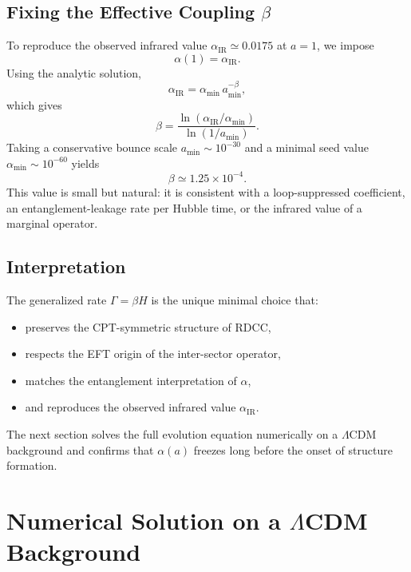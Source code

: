\documentclass[11pt,a4paper]{article}
\begin{document}
\subsection{Fixing the Effective Coupling \texorpdfstring{$\beta$}{beta}}

To reproduce the observed infrared value $\alpha_{\mathrm{IR}} \simeq 0.0175$ at $a = 1$, we impose
\begin{equation}
    \alpha(1) = \alpha_{\mathrm{IR}}.
\end{equation}
Using the analytic solution,
\begin{equation}
    \alpha_{\mathrm{IR}}
    = \alpha_{\min}\,a_{\min}^{-\beta},
\end{equation}
which gives
\begin{equation}
    \beta
    = \frac{\ln(\alpha_{\mathrm{IR}}/\alpha_{\min})}
           {\ln(1/a_{\min})}.
\end{equation}
Taking a conservative bounce scale $a_{\min} \sim 10^{-30}$ and a minimal seed value
$\alpha_{\min} \sim 10^{-60}$ yields
\begin{equation}
    \beta \simeq 1.25 \times 10^{-4}.
\end{equation}
This value is small but natural: it is consistent with a loop-suppressed coefficient, an
entanglement-leakage rate per Hubble time, or the infrared value of a marginal operator.

\subsection{Interpretation}

The generalized rate $\Gamma = \beta H$ is the unique minimal choice that:

\begin{itemize}
    \item preserves the CPT-symmetric structure of RDCC,
    \item respects the EFT origin of the inter-sector operator,
    \item matches the entanglement interpretation of $\alpha$,
    \item and reproduces the observed infrared value $\alpha_{\mathrm{IR}}$.
\end{itemize}

The next section solves the full evolution equation numerically on a $\Lambda$CDM background
and confirms that $\alpha(a)$ freezes long before the onset of structure formation.

\section{Numerical Solution on a \texorpdfstring{$\Lambda$CDM}{Lambda CDM} Background}
\end{document}
